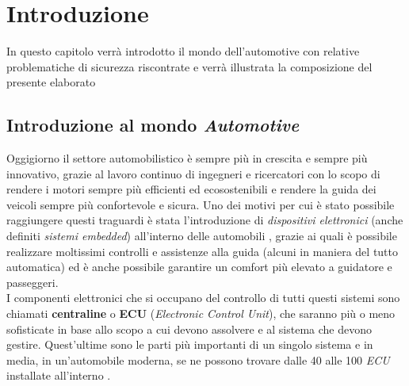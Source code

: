 \chapter{Introduzione}
\begin{citazione}
    In questo capitolo verrà introdotto il mondo dell'automotive con relative problematiche di sicurezza riscontrate e verrà illustrata la composizione del presente elaborato
\end{citazione}

\section{Introduzione al mondo \emph{Automotive}}
Oggigiorno il settore automobilistico è sempre più in crescita e sempre più innovativo, grazie al lavoro continuo di ingegneri e ricercatori con lo scopo di rendere i motori sempre più efficienti ed ecosostenibili e rendere la guida dei veicoli sempre più confortevole e sicura. Uno dei motivi per cui è stato possibile raggiungere questi traguardi è stata l'introduzione di \emph{dispositivi elettronici} (anche definiti \emph{sistemi embedded}) all'interno delle automobili \cite{auto_electronics}, grazie ai quali è possibile realizzare moltissimi controlli e assistenze alla guida (alcuni in maniera del tutto automatica) ed è anche possibile garantire un comfort più elevato a guidatore e passeggeri.\\
I componenti elettronici che si occupano del controllo di tutti questi sistemi sono chiamati \textbf{centraline} o \textbf{ECU} (\emph{Electronic Control Unit}), che saranno più o meno sofisticate in base allo scopo a cui devono assolvere e al sistema che devono gestire. Quest'ultime sono le parti più importanti di un singolo sistema e in media, in un'automobile moderna, se ne possono trovare dalle 40 alle 100 \emph{ECU} installate all'interno \cite{auto_electronics}.

